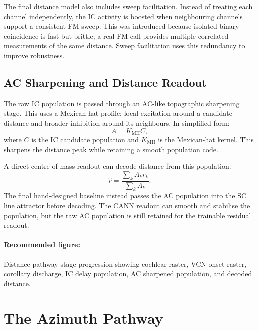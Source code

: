 The final distance model also includes sweep facilitation. Instead of treating each channel independently, the IC activity is boosted when neighbouring channels support a consistent FM sweep. This was introduced because isolated binary coincidence is fast but brittle; a real FM call provides multiple correlated measurements of the same distance. Sweep facilitation uses this redundancy to improve robustness.



\subsection{AC Sharpening and Distance Readout}

The raw IC population is passed through an AC-like topographic sharpening stage. This uses a Mexican-hat profile: local excitation around a candidate distance and broader inhibition around its neighbours. In simplified form:
\begin{equation}
    A = K_{\text{MH}} C,
\end{equation}
where $C$ is the IC candidate population and $K_{\text{MH}}$ is the Mexican-hat kernel. This sharpens the distance peak while retaining a smooth population code.

A direct centre-of-mass readout can decode distance from this population:
\begin{equation}
    \hat{r} = \frac{\sum_k A_k r_k}{\sum_k A_k}.
\end{equation}
The final hand-designed baseline instead passes the AC population into the SC line attractor before decoding. The CANN readout can smooth and stabilise the population, but the raw AC population is still retained for the trainable residual readout.

\paragraph{Recommended figure:} Distance pathway stage progression showing cochlear raster, VCN onset raster, corollary discharge, IC delay population, AC sharpened population, and decoded distance.

\section{The Azimuth Pathway}

